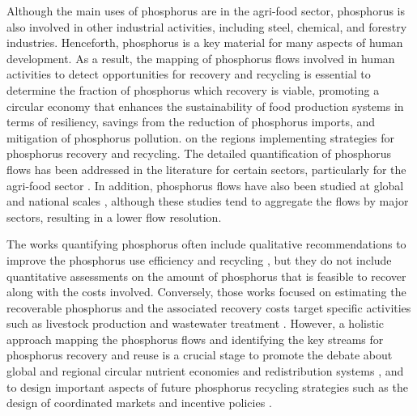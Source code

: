 \documentclass[authoryear]{elsarticle}
\begin{document}
Although the main uses of phosphorus are in the agri-food sector, phosphorus is also involved in other industrial activities, including steel, chemical, and forestry industries. Henceforth, phosphorus is a key material for many aspects of human development. As a result, the mapping of phosphorus flows involved in human activities to detect opportunities for recovery and recycling is essential 
to determine the fraction of phosphorus which recovery is viable, promoting a circular economy that
enhances the sustainability of food production systems in terms of resiliency, savings from the reduction of phosphorus imports, and  mitigation of phosphorus pollution.
on the regions implementing strategies for phosphorus recovery and recycling.
The detailed quantification of phosphorus flows has been addressed in the literature for certain sectors, particularly for the agri-food sector \citep{boh2020nitrogen, zhou2021model, nesme2018global}. In addition, phosphorus flows have also been studied at global \citep{villalba2008global, chen2016half} and national scales \citep{van2016phosphorus, klinglmair2015phosphorus}, although these studies tend to
aggregate the flows by major sectors, resulting in a lower flow resolution. 

The works quantifying phosphorus often include qualitative recommendations to improve the phosphorus use efficiency and recycling \citep{van2016phosphorus, senthilkumar2012conceptual}, but they do not include quantitative assessments on the amount of phosphorus that is feasible to recover along with the costs involved. Conversely, those works focused on estimating the recoverable phosphorus and the associated recovery costs target specific activities such as livestock production \citep{martin2021geospatial, sampat2018technologies} and wastewater treatment \citep{egle_phosphorus_2016, nattorp2017cost}. However, a holistic approach mapping the phosphorus flows and identifying the key streams for phosphorus recovery and reuse is a crucial stage to promote the debate about global and regional circular nutrient economies and redistribution systems \citep{kahiluoto2021global}, and to design important aspects of future phosphorus recycling strategies such as the design of coordinated markets \citep{sampat2019coordinated} and incentive policies \citep{martin2022analysis}.

\end{document}
